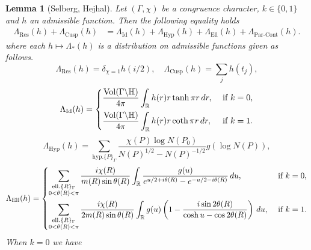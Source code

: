 \documentclass{article}
\newtheorem{lem}[thm]{Lemma}
\theoremstyle{named}
\newcommand{\Hyp}{\mathbb{H}}
\newcommand{\R}{\mathbb{R}}
\DeclareMathOperator{\vol}{Vol}
\begin{document}
\begin{lem}[Selberg, Hejhal]\label{lem:selbergtraceformula}
Let $(\Gamma, \chi)$ be a congruence character, $k \in \{0, 1\}$ and $h$ an admissible function. Then the following equality holds
\begin{equation*}
\begin{aligned}
\Lambda_\text{Res}(h) + \Lambda_\text{Cusp}(h) & = \Lambda_\text{Id}(h) + \Lambda_{\text{Hyp}}(h) + \Lambda_\text{Ell}(h) + \Lambda_\text{Par-Cont}(h).
\end{aligned}
\end{equation*}
where each $h \mapsto \Lambda_*(h)$ is a distribution on admissible functions given as follows.\newline 
\begin{equation*}
    \Lambda_\text{Res}(h) = \delta_{\chi = 1}h(i/2), \quad      \Lambda_\text{Cusp}(h) = \sum_j h(t_j),
\end{equation*}
\begin{equation*}
    \Lambda_\text{Id}(h) = \begin{dcases}
    \frac{\vol(\Gamma\backslash \Hyp)}{4\pi}
        \int_\R h(r) r \tanh \pi r\, dr,  &\text{ if }k = 0,\\
    \frac{\vol(\Gamma \backslash \Hyp)}{4\pi}\int_\R h(r) r\coth \pi r\, dr, & \text{ if }k = 1.
    \end{dcases}
\end{equation*}
\begin{equation*}
    \Lambda_\text{Hyp}(h) = \sum_{\text{hyp.} \{P\}_\Gamma}\frac{\chi(P) \log N(P_0)}{N(P)^{1/2} - N(P)^{-1/2}} g(\log N(P)),
\end{equation*}
\begin{equation*}
    \Lambda_\text{Ell}(h) = \begin{dcases}
        \sum_{\substack{\text{ell.}\{R\}_\Gamma\\0 < \theta(R)< \pi}} \frac{i \chi(R)}{m(R) \sin \theta(R) }\int_\R \frac{g(u)}{e^{u/2 + i\theta(R)} - e^{-u/2 - i\theta(R)}}\, du, & \text{ if }k = 0,\\
        \sum_{\substack{\text{ell.}\{R\}_\Gamma\\0 < \theta(R)< \pi}} \frac{i\chi(R)}{2m(R) \sin \theta(R) }\int_\R g(u)\left(1 - \frac{i \sin 2\theta(R)}{\cosh u - \cos 2\theta(R)}\right)\, du, & \text{ if }k = 1.
    \end{dcases}
\end{equation*}
When $k = 0$ we have
\begin{equation*}
\begin{aligned}

\end{aligned}
\end{equation*}
\end{lem}
\end{document}

